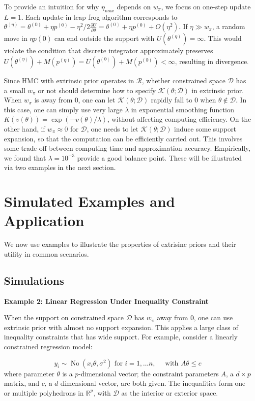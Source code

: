 \documentclass[10pt]{article}
\newcommand{\mc}[1]{\mathcal{#1}}
\DeclareMathOperator{\No}{No}
\DeclareMathOperator{\1}{\mathbbm{1}}
\begin{document}
To provide an intuition for why $\eta_{max}$ depends on $w_\pi$, we focus on one-step update $L=1$. Each update in leap-frog algorithm corresponds to $\theta^{(\eta)}=\theta^{(0)} + \eta  p^{(0)} - \eta^2/2  \frac{\partial U}{\partial  \theta } = \theta^{(0)} + \eta  p^{(0)} + O(\eta^2)$. If $\eta \gg w_\pi$, a random move in $\eta  p(0)$ can end outside the support with $U(\theta^{(\eta)})=\infty$. This would violate the condition that discrete integrator approximately preserves $U(\theta^{(\eta)})+M(p^{(\eta)}) = U(\theta^{(0)})+M(p^{(0)})< \infty$, resulting in divergence.

Since HMC with extrinsic prior operates in $\mc R$, whether constrained space $\mc D$ has a small $w_\pi$ or not should determine
 how to specify $\mc K(\theta; \mc D)$ in extrinsic prior. When $w_\pi$ is away from $0$, one can let $\mc K(\theta; \mc D)$ rapidly fall to $0$ when $\theta\not\in \mc D$. In this case, one can simply use very large $\lambda$ in exponential smoothing function $K(v(\theta))= \exp(-v(\theta)/\lambda)$, without affecting computing efficiency. On the other hand, if $w_\pi \approx 0$ for $\mc D$, one needs to let $\mc K(\theta; \mc D)$ induce some support expansion, so that the computation can be efficiently carried out. This involves some trade-off between computing time and approximation accuracy. Empirically, we found that $\lambda= 10^{-3}$ provide a good balance point. These will be illustrated via two examples in the next section. 


\section{Simulated Examples and Application}

We now use examples to illustrate the properties of extrisinc priors and their utility in common scenarios.

\subsection{Simulations}

{\bf Example 2: Linear Regression Under Inequality Constraint}

When the support on constrained space $\mc D$ has $w_\pi$ away from $0$, one can use extrinsic prior with almost no support expansion. This applies a large class of inequality constraints that has wide support. For example, consider a linearly constrained regression model:

$$y_i \sim \No (x_i \theta, \sigma^2) \text{ for } i=1,\ldots n, \quad\text{ with } A\theta \le c$$
where parameter $\theta$ is a $p$-dimensional vector; the constraint parameters $A$, a $d\times p$ matrix, and $c$, a $d$-dimensional vector, are both given. The inequalities form one or multiple polyhedrons in $\mathbb R^p$, with $\mc D$ as the interior or exterior space.
\end{document}
